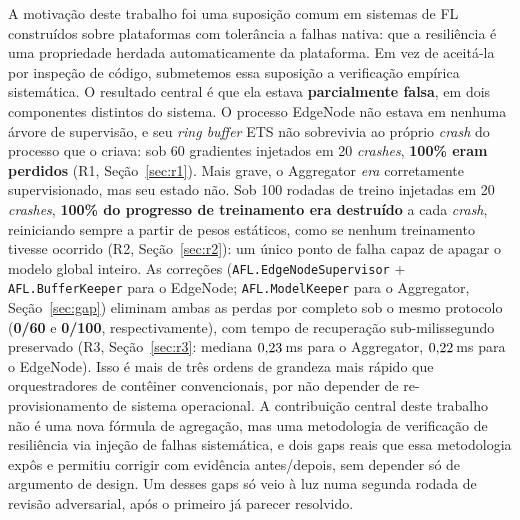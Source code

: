 \documentclass[conference,a4paper]{IEEEtran}
\begin{document}
A motivação deste trabalho foi uma suposição comum em sistemas de FL
construídos sobre plataformas com tolerância a falhas nativa: que a
resiliência é uma propriedade herdada automaticamente da plataforma. Em
vez de aceitá-la por inspeção de código, submetemos essa suposição a
verificação empírica sistemática. O resultado central é que ela estava
\textbf{parcialmente falsa}, em dois componentes distintos do sistema.
O processo EdgeNode não estava em nenhuma árvore de supervisão, e seu
\textit{ring buffer} ETS não sobrevivia ao próprio \textit{crash} do
processo que o criava: sob 60 gradientes injetados em 20
\textit{crashes}, \textbf{100\% eram perdidos} (R1, Seção~\ref{sec:r1}).
Mais grave, o Aggregator \emph{era} corretamente supervisionado, mas seu
estado não. Sob 100 rodadas de treino injetadas em 20 \textit{crashes},
\textbf{100\% do progresso de treinamento era destruído} a cada
\textit{crash}, reiniciando sempre a partir de pesos estáticos, como se
nenhum treinamento tivesse ocorrido (R2, Seção~\ref{sec:r2}): um único
ponto de falha capaz de apagar o modelo global inteiro. As correções
(\texttt{AFL.EdgeNodeSupervisor} + \texttt{AFL.BufferKeeper} para o
EdgeNode; \texttt{AFL.ModelKeeper} para o Aggregator, Seção~\ref{sec:gap})
eliminam ambas as perdas por completo sob o mesmo protocolo
(\textbf{0/60} e \textbf{0/100}, respectivamente), com tempo de
recuperação sub-milissegundo preservado (R3, Seção~\ref{sec:r3}: mediana
$0{,}23$\,ms para o Aggregator, $0{,}22$\,ms para o EdgeNode). Isso é mais de
três ordens de grandeza mais rápido que orquestradores de contêiner
convencionais, por não depender de re-provisionamento de sistema
operacional. A contribuição central deste trabalho não é uma nova
fórmula de agregação, mas uma metodologia de verificação de resiliência
via injeção de falhas sistemática, e dois gaps reais que essa metodologia
expôs e permitiu corrigir com evidência antes/depois, sem depender só de
argumento de design. Um desses gaps só veio à luz numa segunda rodada de
revisão adversarial, após o primeiro já parecer resolvido.
\end{document}
